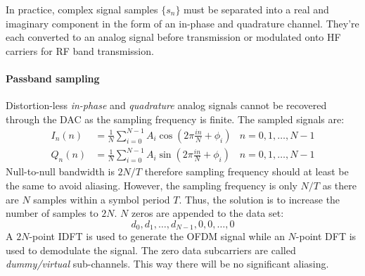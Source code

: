 In practice, complex signal samples \(\{s_n\}\) must be separated into a real and imaginary component in the form of an in-phase and quadrature channel. They're each converted to an analog signal before transmission or modulated onto \gls{HF} carriers for \gls{RF} band transmission.
\paragraph{Passband sampling} Distortion-less \emph{in-phase} and \emph{quadrature} analog signals cannot be recovered through the \gls{DAC} as the sampling frequency is finite. The sampled signals are:
\begin{align*}
	I_n(n) &= \frac{1}{N}\sum_{i=0}^{N-1} A_i\cos \left( 2\pi \frac{in}{N} + \phi_i\right) & n = 0,1,\ldots,N-1 \\
	Q_n(n) &= \frac{1}{N}\sum_{i=0}^{N-1} A_i\sin \left( 2\pi \frac{in}{N} + \phi_i\right) & n = 0,1,\ldots,N-1
\end{align*}
Null-to-null bandwidth is \(2N/T\) therefore sampling frequency should at least be the same to avoid aliasing. However, the sampling frequency is only \(N/T\) as there are \(N\) samples within a symbol period \(T\). Thus, the solution is to increase the number of samples to \(2N\). \(N\) zeros are appended to the data set:
\[
	d_0, d_1, \ldots, d_{N-1}, 0, 0, \ldots, 0
\]
A \(2N\)-point \gls{IDFT} is used to generate the \gls{OFDM} signal while an \(N\)-point \gls{DFT} is used to demodulate the signal. The zero data subcarriers are called \emph{dummy/virtual} sub-channels. This way there will be no significant aliasing.
